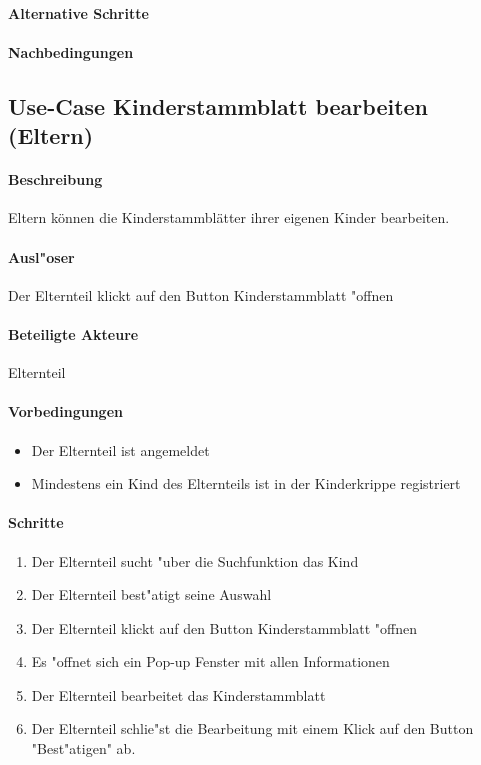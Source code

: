   \paragraph{Alternative Schritte}
  \paragraph{Nachbedingungen}
  
  
  
  
  \newpage
  \subsection{Use-Case Kinderstammblatt bearbeiten (Eltern)}
  \paragraph{Beschreibung}
  Eltern können die Kinderstammblätter ihrer eigenen Kinder bearbeiten. 
  \paragraph{Ausl"oser}
  Der Elternteil klickt auf den Button \dq Kinderstammblatt "offnen\dq
  \paragraph{Beteiligte Akteure}   \leavevmode \newline
  Elternteil
  \paragraph{Vorbedingungen}
  \begin{itemize}
  	\item Der Elternteil ist angemeldet
  	\item Mindestens ein Kind des Elternteils ist in der Kinderkrippe registriert
  \end{itemize}
  
  \paragraph{Schritte}
  \begin{enumerate}
  	\item Der Elternteil sucht "uber die Suchfunktion das Kind
  	\item Der Elternteil best"atigt seine Auswahl
  	\item Der Elternteil klickt auf den Button \dq Kinderstammblatt "offnen\dq
  	\item Es "offnet sich ein Pop-up Fenster mit allen Informationen
  	\item Der Elternteil bearbeitet das Kinderstammblatt
  	\item Der Elternteil schlie"st die Bearbeitung mit einem Klick auf den Button "Best"atigen" ab. 
  \end{enumerate}

